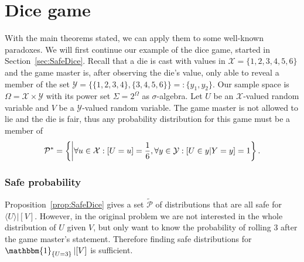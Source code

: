 \documentclass[a4paper]{report}
\theoremstyle{plain}
\theoremstyle{definition}
\theoremstyle{remark}
\numberwithin{equation}{chapter}
\let\P\relax
\DeclareMathOperator{\P}{\mathbb{P}}
\DeclareMathOperator{\1}{\mathbbm{1}}
\newcommand{\X}{\mathcal{X}}
\newcommand{\Y}{\mathcal{Y}}
\newcommand{\Pmod}{\mathcal{P}^*}
\newcommand{\DieInd}{\1_{\{U=3\}}}
\begin{document}
\section{Dice game}\label{sec:DiscDice}
With the main theorems stated, we can apply them to some well-known paradoxes. We will first continue our example of the dice game, started in Section~\ref{sec:SafeDice}. Recall that a die is cast with values in $\X=\{1,2,3,4,5,6\}$ and the game master is, after observing the die's value, only able to reveal a member of the set $\Y=\{\{1,2,3,4\},\{3,4,5,6\}\}=:\{y_1,y_2\}$. Our sample space is $\Omega=\X\times\Y$ with its power set $\Sigma=2^\Omega$ as $\sigma$-algebra. Let $U$ be an $\X$-valued random variable and $V$ be a $\Y$-valued random variable. The game master is not allowed to lie and the die is fair, thus any probability distribution for this game must be a member of \begin{equation}
\Pmod=\left\{\P\middle|\forall u\in\X:\P[U=u]=\frac{1}{6},\forall y\in\Y:\P[U\in y|Y=y]=1\right\}.
\end{equation}

\subsubsection{Safe probability}
Proposition~\ref{prop:SafeDice} gives a set $\tilde{\mathcal{P}}$ of distributions that are all safe for $\langle U\rangle|[V]$. However, in the original problem we are not interested in the whole distribution of $U$ given $V$, but only want to know the probability of rolling $3$ after the game master's statement. Therefore finding safe distributions for $\DieInd|[V]$ is sufficient.
\end{document}

